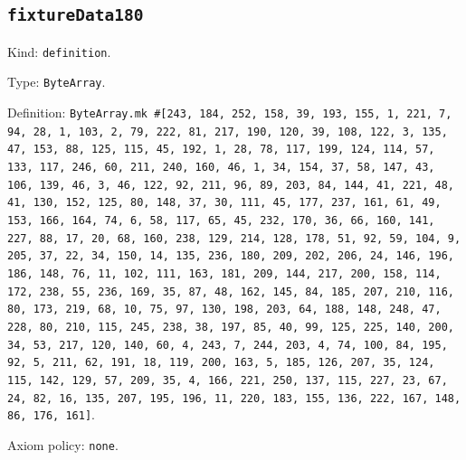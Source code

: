 \documentclass[11pt]{article}
\begin{document}
\subsection*{\texttt{fixtureData180}}
\noindent Kind: \texttt{definition}.\par
\noindent Type: \texttt{ByteArray}.\par
\noindent Definition: \texttt{ByteArray.mk \#[243, 184, 252, 158, 39, 193, 155, 1, 221, 7, 94, 28, 1, 103, 2, 79, 222, 81, 217, 190, 120, 39, 108, 122, 3, 135, 47, 153, 88, 125, 115, 45, 192, 1, 28, 78, 117, 199, 124, 114, 57, 133, 117, 246, 60, 211, 240, 160, 46, 1, 34, 154, 37, 58, 147, 43, 106, 139, 46, 3, 46, 122, 92, 211, 96, 89, 203, 84, 144, 41, 221, 48, 41, 130, 152, 125, 80, 148, 37, 30, 111, 45, 177, 237, 161, 61, 49, 153, 166, 164, 74, 6, 58, 117, 65, 45, 232, 170, 36, 66, 160, 141, 227, 88, 17, 20, 68, 160, 238, 129, 214, 128, 178, 51, 92, 59, 104, 9, 205, 37, 22, 34, 150, 14, 135, 236, 180, 209, 202, 206, 24, 146, 196, 186, 148, 76, 11, 102, 111, 163, 181, 209, 144, 217, 200, 158, 114, 172, 238, 55, 236, 169, 35, 87, 48, 162, 145, 84, 185, 207, 210, 116, 80, 173, 219, 68, 10, 75, 97, 130, 198, 203, 64, 188, 148, 248, 47, 228, 80, 210, 115, 245, 238, 38, 197, 85, 40, 99, 125, 225, 140, 200, 34, 53, 217, 120, 140, 60, 4, 243, 7, 244, 203, 4, 74, 100, 84, 195, 92, 5, 211, 62, 191, 18, 119, 200, 163, 5, 185, 126, 207, 35, 124, 115, 142, 129, 57, 209, 35, 4, 166, 221, 250, 137, 115, 227, 23, 67, 24, 82, 16, 135, 207, 195, 196, 11, 220, 183, 155, 136, 222, 167, 148, 86, 176, 161]}.\par
\noindent Axiom policy: \texttt{none}.\par
\end{document}
